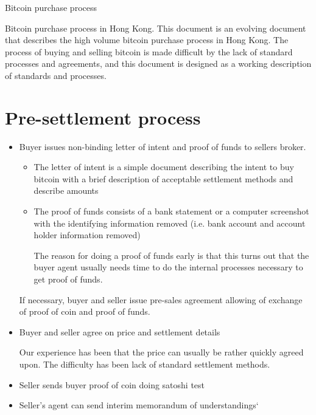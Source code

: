 \documentclass[10pt]{article}
\begin{document}
\begin{center}
{\Large Bitcoin purchase process}
\end{center}

Bitcoin purchase process in Hong Kong.  This document is an evolving
document that describes the high volume bitcoin purchase process in
Hong Kong.  The process of buying and selling bitcoin is made
difficult by the lack of standard processes and agreements, and this
document is designed as a working description of standards and
processes.

\section{Pre-settlement process}

\begin{itemize}
\item Buyer issues non-binding letter of intent and proof of funds to
sellers broker.

\begin{itemize}
\item The letter of intent is a simple document describing the intent
  to buy bitcoin with a brief description of acceptable settlement
  methods and describe amounts
  
\item The proof of funds consists of a bank statement or a computer
screenshot with the identifying information removed (i.e. bank account
and account holder information removed)

The reason for doing a proof of funds early is that this turns out
that the buyer agent usually needs time to do the internal processes
necessary to get proof of funds.  
\end{itemize}

If necessary, buyer and seller issue pre-sales agreement allowing of
exchange of proof of coin and proof of funds.

\item Buyer and seller agree on price and settlement details

Our experience has been that the price can usually be rather quickly
agreed upon.  The difficulty has been lack of standard settlement
methods.

\item Seller sends buyer proof of coin doing satoshi test

\item Seller's agent can send interim memorandum of understandings`


\end{itemize}
\end{document}
